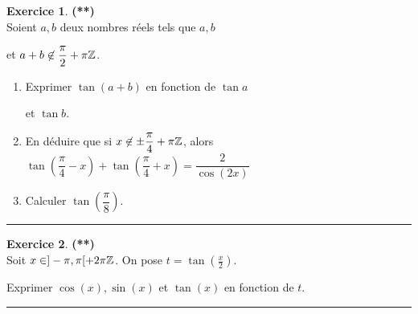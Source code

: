 \documentclass[a4paper,11pt]{article}
\theoremstyle{definition}
\newtheorem{exo}{Exercice} %
\begin{document}
\begin{minipage}{1\linewidth}
\begin{minipage}[t]{0.48\linewidth}
		
		\begin{exo}\textbf{(**)}\quad\\[0.2cm]
			Soient $a,b$ deux nombres réels tels que $a, b$ 
			
			et $a+b \not\in \dfrac{\pi}{2} + \pi\mathbb{Z}$. 
			\begin{enumerate}
				\item Exprimer $\tan (a+b)$ en fonction de $\tan a$
				
				 et $ \tan b$. 
				\item En déduire que si $x\not\in \pm\dfrac{\pi}{4}+ \pi\mathbb{Z}$, alors 
				$\tan(\dfrac{\pi}{4} - x)+\tan(\dfrac{\pi}{4}+x)=\dfrac{2}{\cos(2x)}$
				\item Calculer $\tan(\dfrac{\pi}{8})$.
			\end{enumerate}

			
			
			\centering
			\rule{1\linewidth}{0.6pt}
		\end{exo}
		
				\begin{exo}\textbf{(**)}\quad\\[0.2cm]
			Soit $x\in]-\pi,\pi[+2\pi\mathbb{Z}$. On pose $t=\tan(\frac{x}{2})$.
			
			 Exprimer $\cos(x), \sin(x)$ et $\tan(x)$ en fonction de $t$. 
			
			\centering
			\rule{1\linewidth}{0.6pt}
		\end{exo}
	
	
		
		
	\end{minipage}
\end{minipage}
	
\end{document}
